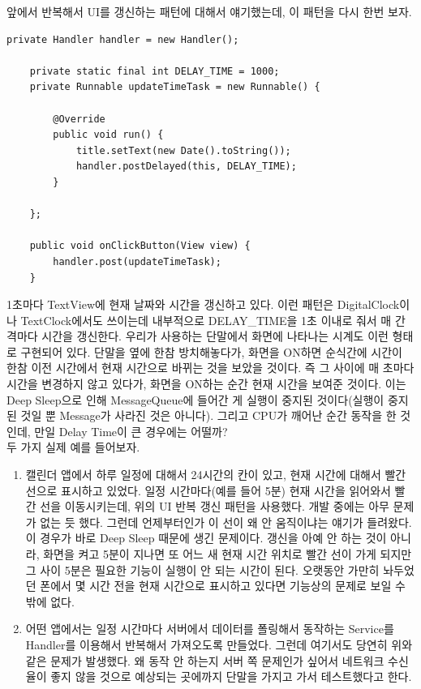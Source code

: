 앞에서 반복해서 UI를 갱신하는 패턴에 대해서 얘기했는데, 이 패턴을 다시 한번 보자.
\begin{lstlisting}[frame=single, caption=Deep Sleep 대응 필요, label=src:DefaultUpdateTime] 
  	private Handler handler = new Handler();

	private static final int DELAY_TIME = 1000;
	private Runnable updateTimeTask = new Runnable() {

		@Override
		public void run() {
			title.setText(new Date().toString());
			handler.postDelayed(this, DELAY_TIME);
		}

	};

	public void onClickButton(View view) {
		handler.post(updateTimeTask);
	}
\end{lstlisting}
1초마다 TextView에 현재 날짜와 시간을 갱신하고 있다.
이런 패턴은 DigitalClock이나 TextClock에서도 쓰이는데 내부적으로 DELAY\_TIME을 1초 이내로 줘서 매 간격마다 시간을 갱신한다. 
우리가 사용하는 단말에서 화면에 나타나는 시계도 이런 형태로 구현되어 있다.
단말을 옆에 한참 방치해놓다가, 화면을 ON하면 순식간에 시간이 한참 이전 시간에서 현재 시간으로 바뀌는 것을 보았을 것이다. 즉 그 사이에 매 초마다 시간을 변경하지 않고 있다가, 화면을 ON하는 순간 현재 시간을 보여준 것이다.
이는 Deep Sleep으로 인해 MessageQueue에 들어간 게 실행이 중지된 것이다(실행이 중지된 것일 뿐 Message가 사라진 것은 아니다).
그리고 CPU가 깨어난 순간 동작을 한 것인데, 만일 Delay Time이 큰 경우에는 어떨까?\\

두 가지 실제 예를 들어보자.
\begin{enumerate}
\item 캘린더 앱에서 하루 일정에 대해서 24시간의 칸이 있고, 현재 시간에 대해서 빨간 선으로 표시하고 있었다. 
일정 시간마다(예를 들어 5분) 현재 시간을 읽어와서 빨간 선을 이동시키는데, 위의 UI 반복 갱신 패턴을 사용했다.
개발 중에는 아무 문제가 없는 듯 했다. 그런데 언제부터인가 이 선이 왜 안 움직이냐는 얘기가 들려왔다.
이 경우가 바로 Deep Sleep 때문에 생긴 문제이다. 
갱신을 아예 안 하는 것이 아니라, 화면을 켜고 5분이 지나면 또 어느 새 현재 시간 위치로 빨간 선이 가게 되지만 그 사이 5분은 필요한 기능이 실행이 안 되는 시간이 된다.
오랫동안 가만히 놔두었던 폰에서 몇 시간 전을 현재 시간으로 표시하고 있다면 기능상의 문제로 보일 수 밖에 없다.

\item 어떤 앱에서는 일정 시간마다 서버에서 데이터를 폴링해서 동작하는 Service를 Handler를 이용해서 반복해서 가져오도록 만들었다. 그런데 여기서도 당연히 위와 같은 문제가 발생했다. 왜 동작 안 하는지 서버 쪽 문제인가 싶어서 네트워크 수신율이 좋지 않을 것으로 예상되는 곳에까지 단말을 가지고 가서 테스트했다고 한다.
\end{enumerate}

